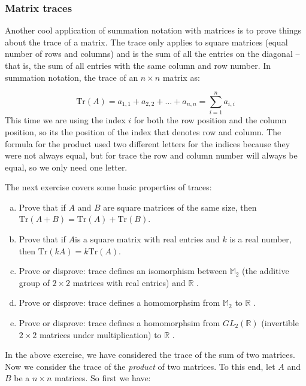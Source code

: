 \subsubsection*{Matrix traces}
Another cool application of summation notation with matrices is to prove things about the {\bfi trace} of a matrix.  The trace only applies to square matrices (equal number of rows and columns) and is the sum of all the entries on the diagonal -- that is,  the sum of all entries with the same column and row number.  In summation notation, the trace of an $n \times n$ matrix as:

\[ \text{Tr} \left( A \right)= a_{1,1} + a_{2,2} + \ldots + a_{n,n} = \sum_{i=1}^n a_{i,i} \] 
This time we are using the index $i$ for both the row position and the column position, so its the position of the index that denotes row and column.  The formula for the product used two different letters for the indices because they were not always equal, but for trace the row and column number will always be equal, so we only need one letter.

The next exercise covers some basic properties of traces:

\begin{exercise}{}
\begin{enumerate}[(a)]
\item
Prove that if $A$ and $B$ are square matrices of the same size, then $\text{Tr} \left( A + B \right) = \text{Tr} \left( A \right) + \text{Tr} \left( B \right)$.
\item
Prove that if $A $is a square matrix with real entries and $k$ is a real number, then $\text{Tr} \left(k A  \right) = k\text{Tr} \left( A \right)$.
\item
Prove or disprove: trace defines an isomorphism between $\mathbb{M}_2$ (the additive group of $2 \times 2$ matrices with real entries) and $\mathbb{R}$ .
\item
Prove or disprove: trace defines a homomorphsim from $\mathbb{M}_2$ to $\mathbb{R}$ .
\item
Prove or disprove: trace defines a homomorphsim from $GL_2(\mathbb{R})$ (invertible $2 \times 2$ matrices under multiplication)  to $\mathbb{R}$ .
\end{enumerate}
\end{exercise}


In the above exercise, we have considered the trace of the sum of two matrices. Now we consider the trace of the \emph{product} of two matrices.  To this end, let ${A}$ and  ${B}$ be a $n \times n$ matrices.  So first we have:

